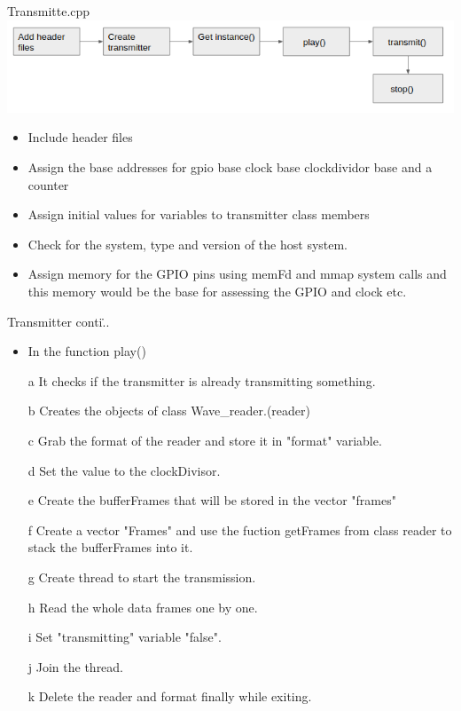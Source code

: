 \documentclass{beamer}
\begin{document}
\begin{frame}{Transmitte.cpp}
\includegraphics[scale=0.5]{tran.png}
\begin{itemize}
\item  Include header files \\

\item Assign the base addresses for gpio base clock base clockdividor base and a counter \\

\item Assign initial values for variables to transmitter class members
\item Check for the system, type and version  of the host system.

\item Assign memory for the GPIO pins using memFd and mmap system calls and this memory would be the base for assessing the GPIO and clock etc. 




\end{itemize}
 

\end{frame}





\begin{frame}{Transmitter conti\...}
\begin{itemize}
\item In the function play()
\item[a] It checks if the transmitter is already transmitting something. 
\item[b] Creates the objects of class Wave\_reader.(reader)
\item[c] Grab the format of the reader and store it in "format" variable.
\item[d] Set the value to the clockDivisor.
\item[e] Create the bufferFrames that will be stored in the vector "frames"
\item[f] Create a vector "Frames" and use the fuction getFrames from class reader to stack the bufferFrames into it.
 
\item[g] Create thread to start the transmission.

\item[h] Read the whole data frames one by one. 
\item[i] Set "transmitting" variable "false".
\item[j] Join the thread.
\item[k] Delete the reader and format finally while exiting.
\end{itemize}

\end{frame}
\end{document}
